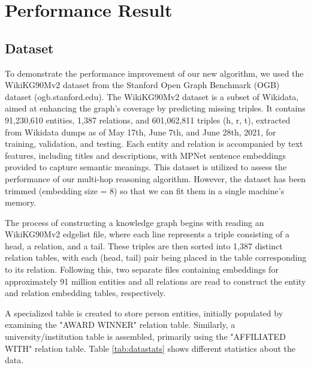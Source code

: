 \documentclass[sigconf]{acmart}
\begin{document}
\section{Performance Result}
\subsection{Dataset}
To demonstrate the performance improvement of our new algorithm, we used the WikiKG90Mv2\cite{hu2021ogblsc} dataset from the Stanford Open Graph Benchmark (OGB) dataset (ogb.stanford.edu). The WikiKG90Mv2 dataset is a subset of Wikidata, aimed at enhancing the graph's coverage by predicting missing triples. It contains 91,230,610 entities, 1,387 relations, and 601,062,811 triples (h, r, t), extracted from Wikidata dumps as of May 17th, June 7th, and June 28th, 2021, for training, validation, and testing. Each entity and relation is accompanied by text features, including titles and descriptions, with MPNet\cite{song2020mpnet} sentence embeddings \cite{reimers2019sentence} provided to capture semantic meanings. This dataset is utilized to assess the performance of our multi-hop reasoning algorithm. However, the dataset has been trimmed (embedding size = 8)  so that we can fit them in a single machine's memory.

The process of constructing a knowledge graph begins with reading an WikiKG90Mv2 edgelist file, where each line represents a triple consisting of a head, a relation, and a tail. These triples are then sorted into 1,387 distinct relation tables, with each (head, tail) pair being placed in the table corresponding to its relation. Following this, two separate files containing embeddings for approximately 91 million entities and all relations are read to construct the entity and relation embedding tables, respectively.

A specialized table is created to store person entities, initially populated by examining the "AWARD WINNER" relation table. Similarly, a university/institution table is assembled, primarily using the "AFFILIATED WITH" relation table. Table \ref{tab:datastats} shows different statistics about the data. 
\end{document}
